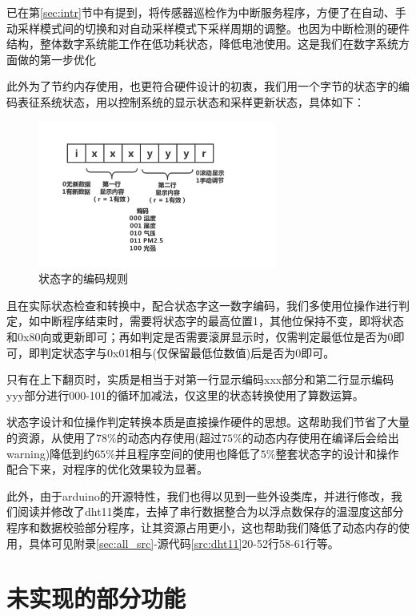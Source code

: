 \documentclass[a4paper, 11pt]{article} %
\begin{document}
已在第\ref{sec:intr}节中有提到，将传感器巡检作为中断服务程序，方便了在自动、手动采样模式间的切换和对自动采样模式下采样周期的调整。也因为中断检测的硬件结构，整体数字系统能工作在低功耗状态，降低电池使用。这是我们在数字系统方面做的第一步优化

此外为了节约内存使用，也更符合硬件设计的初衷，我们用一个字节的状态字的编码表征系统状态，用以控制系统的显示状态和采样更新状态，具体如下：

\begin{figure}[H]
  \centering
  \includegraphics[width = 0.7\textwidth]{state_word.png}
  \caption{状态字的编码规则}
\end{figure}

且在实际状态检查和转换中，配合状态字这一数字编码，我们多使用位操作进行判定，如中断程序结束时，需要将状态字的最高位置1，其他位保持不变，即将状态和0x80向或更新即可；再如判定是否需要滚屏显示时，仅需判定最低位是否为0即可，即判定状态字与0x01相与(仅保留最低位数值)后是否为0即可。

只有在上下翻页时，实质是相当于对第一行显示编码xxx部分和第二行显示编码yyy部分进行000-101的循环加减法，仅这里的状态转换使用了算数运算。

状态字设计和位操作判定转换本质是直接操作硬件的思想。这帮助我们节省了大量的资源，从使用了$78\%$的动态内存使用(超过$75\%$的动态内存使用在编译后会给出warning)降低到约$65
\%$并且程序空间的使用也降低了$5\%$整套状态字的设计和操作配合下来，对程序的优化效果较为显著。

此外，由于arduino的开源特性，我们也得以见到一些外设类库，并进行修改，我们阅读并修改了dht11类库，去掉了串行数据整合为以浮点数保存的温湿度这部分程序和数据校验部分程序，让其资源占用更小，这也帮助我们降低了动态内存的使用，具体可见附录\ref{sec:all_src}-源代码\ref{src:dht11}20-52行58-61行等。

\section{未实现的部分功能}
\end{document}
